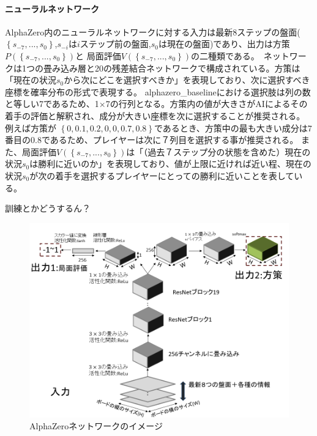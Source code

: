 \paragraph{ニューラルネットワーク}
AlphaZero内のニューラルネットワークに対する入力は最新$8$ステップの盤面($\left\{ s_{-7}, ..., s_0 \right\}$,$s_{-i}$は$i$ステップ前の盤面,$s_{0}$は現在の盤面)であり、出力は方策$P(\left\{ s_{-7}, ..., s_0 \right\})$と
局面評価$V(\left\{ s_{-7}, ..., s_0 \right\})$の二種類である。\
ネットワークは1つの畳み込み層と20の残差結合ネットワークで構成されている。方策は「現在の状況$s_0$から次にどこを選択すべきか」を表現しており、次に選択すべき座標を確率分布の形式で表現する。
alphazero\_baselineにおける選択肢は列の数と等しい7であるため、1$\times$7の行列となる。方策内の値が大きさがAIによるその着手の評価と解釈され、成分が大きい座標を次に選択することが推奨される。例えば方策が
$\left\{0, 0.1, 0.2, 0, 0, 0.7, 0.8\right\}$であるとき、方策中の最も大きい成分は7番目の0.8であるため、プレイヤーは次に７列目を選択する事が推奨される。
また、局面評価$V(\left\{ s_{-7}, ..., s_0 \right\})$は「（過去７ステップ分の状態を含めた）現在の状況$s_0$は勝利に近いのか」を表現しており、値が上限に近ければ近い程、現在の状況$s_0$が次の着手を選択するプレイヤーにとっての勝利に近いことを表している。

訓練とかどうするん？
\begin{figure}[t]
	\centering
	\includegraphics[width=\linewidth]{./figure/network.png}
	\caption{AlphaZeroネットワークのイメージ}
	\label{fig:network}
\end{figure}
